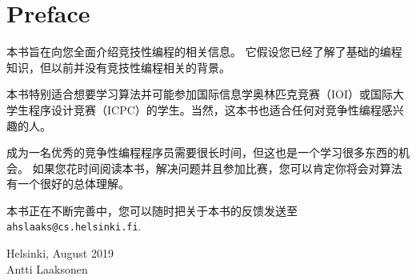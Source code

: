 \chapter*{Preface}

本书旨在向您全面介绍竞技性编程的相关信息。
它假设您已经了解了基础的编程知识，但以前并没有竞技性编程相关的背景。

本书特别适合想要学习算法并可能参加国际信息学奥林匹克竞赛（IOI）或国际大学生程序设计竞赛（ICPC）的学生。当然，这本书也适合任何对竞争性编程感兴趣的人。

成为一名优秀的竞争性编程程序员需要很长时间，但这也是一个学习很多东西的机会。
如果您花时间阅读本书，解决问题并且参加比赛，您可以肯定你将会对算法有一个很好的总体理解。

本书正在不断完善中，您可以随时把关于本书的反馈发送至 \\
\texttt{ahslaaks@cs.helsinki.fi}.

\begin{flushright}
Helsinki, August 2019 \\
Antti Laaksonen
\end{flushright}
